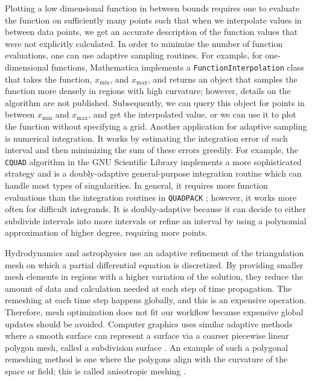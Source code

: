 Plotting a low dimensional function in between bounds requires one to evaluate the function on sufficiently many points such that when we interpolate values in between data points, we get an accurate description of the function values that were not explicitly calculated.
In order to minimize the number of function evaluations, one can use adaptive sampling routines.
For example, for one-dimensional functions, Mathematica \cite{WolframResearch} implements a \passthrough{\lstinline!FunctionInterpolation!} class that takes the function, $x_\textrm{min}$, and $x_\textrm{max}$, and returns an object that samples the function more densely in regions with high curvature; however, details on the algorithm are not published.
Subsequently, we can query this object for points in between $x_\textrm{min}$ and $x_\textrm{max}$, and get the interpolated value, or we can use it to plot the function without specifying a grid.
Another application for adaptive sampling is numerical integration.
It works by estimating the integration error of each interval and then minimizing the sum of these errors greedily.
For example, the \passthrough{\lstinline!CQUAD!} algorithm \cite{Gonnet2010} in the GNU Scientific Library \cite{Galassi1996} implements a more sophisticated strategy and is a doubly-adaptive general-purpose integration routine which can handle most types of singularities.
In general, it requires more function evaluations than the integration routines in \passthrough{\lstinline!QUADPACK!} \cite{Galassi1996}; however, it works more often for difficult integrands.
It is doubly-adaptive because it can decide to either subdivide intervals into more intervals or refine an interval by using a polynomial approximation of higher degree, requiring more points.


Hydrodynamics \cite{Berger1989, Berger1984} and astrophysics \cite{Klein1999} use an adaptive refinement of the triangulation mesh on which a partial differential equation is discretized.
By providing smaller mesh elements in regions with a higher variation of the solution, they reduce the amount of data and calculation needed at each step of time propagation.
The remeshing at each time step happens globally, and this is an expensive operation.
Therefore, mesh optimization does not fit our workflow because expensive global updates should be avoided.
Computer graphics uses similar adaptive methods where a smooth surface can represent a surface via a coarser piecewise linear polygon mesh, called a subdivision surface \cite{DeRose1998}.
An example of such a polygonal remeshing method is one where the polygons align with the curvature of the space or field; this is called anisotropic meshing \cite{Alliez2003}.

